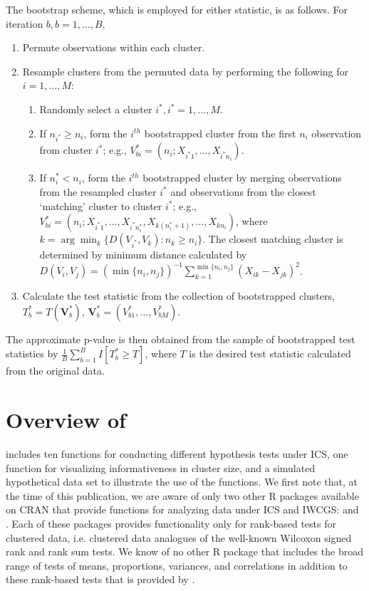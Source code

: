 The bootstrap scheme, which is employed for either statistic, is as follows. For iteration $b,b=1,\ldots,B$,  \
\begin{enumerate}
	\item	Permute observations within each cluster.
	\item Resample clusters from the permuted data by performing the following for $i = 1,\ldots, M$: 
	\begin{enumerate}
		\item Randomly select a cluster $i^{*},i^{*}=1,\ldots,M$. 
		\item If $n_{i^{*}} \geq n_{i}$, form the $i^{th}$ bootstrapped cluster from the first $n_{i}$ observation from cluster $i^{*}$; e.g., $V_{bi}^{*}=\left(n_{i}; X_{i^{*}1},\ldots,X_{i^{*}n_{i}}\right)$.
		\item 	If $n_{i}^{*}<n_{i}$, form the $i^{th}$ bootstrapped cluster by merging observations from the resampled cluster $i^{*}$ and observations from the closest ‘matching’ cluster to cluster $i^{*}$; e.g., $V_{bi}^{*}=\left(n_{i}; X_{i^{*}1},\ldots,X_{i^{*} n_{i}^{*}},X_{k(n_{i}^{*}+1)},\ldots,X_{kn_{i}}\right)$, where $k=\arg\min_{k} \{D(V_{i^{*}}, V_{k}): n_{k} \geq n_{i}\}$. The closest matching cluster is determined by minimum distance calculated by $D\left(V_{i},V_{j}\right)=\left(\min\{n_{i}, n_{j}\}\right)^{-1} \sum_{k=1}^{\min\{n_{i}, n_{j}\}}\left(X_{ik}-X_{jk}\right)^{2}$.
	\end{enumerate}
	\item Calculate the test statistic from the collection of bootstrapped clusters, $T_{b}^{*}=T\left(\bm{V}_{b}^{*}\right)$, $\bm{V}_{b}^{*}=\left(V_{b1}^{*},\ldots,V_{bM}^{*}\right)$.  	
\end{enumerate}

The approximate p-value is then obtained from the sample of bootstrapped test statistics by $\frac{1}{B}\sum_{b=1}^{B}I\left[T_{b}^{*} \geq T\right]$, where $T$ is the desired test statistic calculated from the original data.

\section[Overview of htestClust]{Overview of } \label{s:overview}

 includes ten functions for conducting different hypothesis tests under ICS, one function for visualizing informativeness in cluster size, and a simulated hypothetical data set to illustrate the use of the functions. We first note that, at the time of this publication, we are aware of only two other R packages available on CRAN that provide functions for analyzing data under ICS and IWCGS:  \citep{jiang18} and  \citep{dutta16b}. Each of these packages provides functionality only for rank-based tests for clustered data, i.e. clustered data analogues of the well-known Wilcoxon signed rank and rank sum tests. We know of no other R package that includes the broad range of tests of means, proportions, variances, and correlations in addition to these rank-based tests that is provided by .

